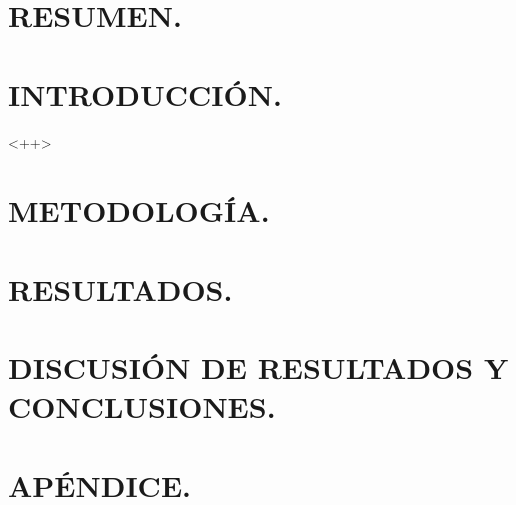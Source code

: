\documentclass[12pt,a4paper]{article}
\begin{document}
\mytitlepage

\section{RESUMEN.} %

\section{INTRODUCCIÓN.} %
<++>

\section{METODOLOGÍA.} %

\section{RESULTADOS.} %

\section{DISCUSIÓN DE RESULTADOS Y CONCLUSIONES.} %

% 
% 

\section{APÉNDICE.} %
\end{document}
